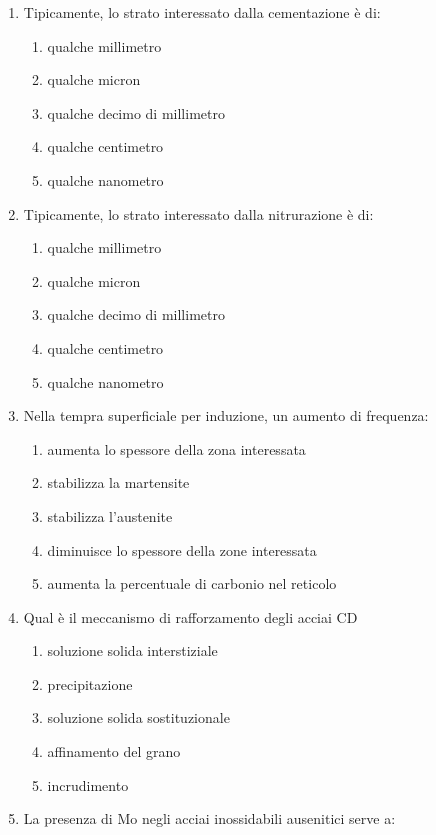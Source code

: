 \begin{enumerate}
\begin{enumerate}
    \end{enumerate}
    \item Tipicamente, lo strato interessato dalla cementazione è di:
    \begin{enumerate}
        \item qualche millimetro
        \item qualche micron
        \item qualche decimo di millimetro 
        \item qualche centimetro
        \item qualche nanometro
    \end{enumerate}
    \item Tipicamente, lo strato interessato dalla nitrurazione è di:
    \begin{enumerate}
        \item qualche millimetro
        \item qualche micron 
        \item qualche decimo di millimetro 
        \item qualche centimetro
        \item qualche nanometro
    \end{enumerate}
    \item Nella tempra superficiale per induzione, un aumento di frequenza:
    \begin{enumerate}
        \item aumenta lo spessore della zona interessata 
        \item stabilizza la martensite
        \item stabilizza l'austenite
        \item diminuisce lo spessore della zone interessata 
        \item aumenta la percentuale di carbonio nel reticolo
    \end{enumerate}
    \item Qual è il meccanismo di rafforzamento degli acciai CD
    \begin{enumerate}
        \item soluzione solida interstiziale
        \item precipitazione
        \item soluzione solida sostituzionale
        \item affinamento del grano
        \item incrudimento 
    \end{enumerate}
    \item La presenza di Mo negli acciai inossidabili ausenitici serve a:

\end{enumerate}
